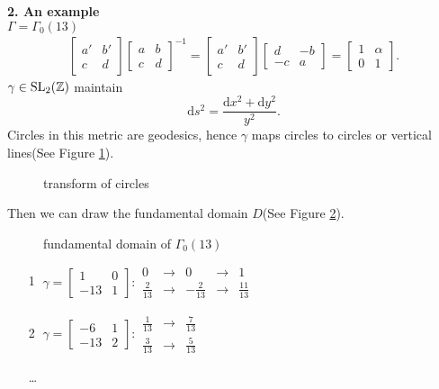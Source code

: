 \noindent\textbf{2. An example}\\
$\Gamma=\Gamma_0(13)$
\begin{align*}
  \begin{bmatrix} a'&b'\\c&d \end{bmatrix} \begin{bmatrix} a&b\\c&d \end{bmatrix}^{-1} = \begin{bmatrix} a'&b'\\c&d \end{bmatrix} \begin{bmatrix} d&-b\\-c&a \end{bmatrix} =\begin{bmatrix} 1&\alpha\\0&1 \end{bmatrix} 
.\end{align*}
$\gamma \in \operatorname{SL}_2(\mathbb{Z})$ maintain
\[
\mathrm{d}s^2= \frac{\mathrm{d}x^2+\mathrm{d}y^2}{y^2}.
\] 
Circles in this metric are geodesics, hence $\gamma$ maps circles to circles or vertical lines(See Figure \ref{fig:transform-of-circles}).
\begin{figure}[ht]
    \centering
    \caption{transform of circles}
    \label{fig:transform-of-circles}
\end{figure}

Then we can draw the fundamental domain $D$(See Figure \ref{fig:fundamental-domain-of-13}).
\begin{figure}[ht]
    \centering
    \caption{fundamental domain of $\Gamma_0(13)$}
    \label{fig:fundamental-domain-of-13}
\end{figure}
\begin{enumerate}
  \item [\textcircled{1}] $\gamma=\begin{bmatrix} 1&0\\-13&1 \end{bmatrix}: \begin{matrix} 0&\to&0&\to & 1\\\frac{2}{13}&\to&-\frac{2}{13}&\to&\frac{11}{13} \end{matrix}  $
  \item [\textcircled{2}] $\gamma=\begin{bmatrix} -6 &1\\-13&2 \end{bmatrix}:\begin{matrix} \frac{1}{13}&\to &\frac{7}{13}\\\frac{3}{13}&\to&\frac{5}{13} \end{matrix}  $
  \item [\ldots]
\end{enumerate}

